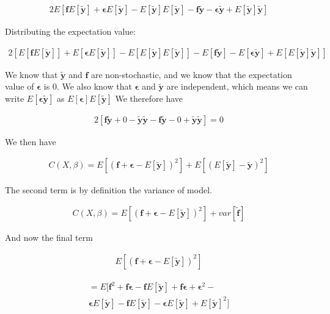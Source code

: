 \documentclass[twocolumn,10pt,cleanfoot]{asme2ej}
\begin{document}
\begin{gather}
2E\left[\bm{f}E[\bm{\tilde{y}}] + \bm{\epsilon}E[\bm{\tilde{y}}] - E[\bm{\tilde{y}}]E[\bm{\tilde{y}}] - \bm{f}\bm{\tilde{y}} - \bm{\epsilon}\bm{\tilde{y}} + E[\bm{\tilde{y}}]\bm{\tilde{y}}\right] 
\end{gather}

Distributing the expectation value:

\begin{gather}
2\left[E[\bm{f}E[\bm{\tilde{y}}]] + E[\bm{\epsilon}E[\bm{\tilde{y}}]] - E[E[\bm{\tilde{y}}]E[\bm{\tilde{y}}]] - E[\bm{f}\bm{\tilde{y}}] - E[\bm{\epsilon}\bm{\tilde{y}}] + E[E[\bm{\tilde{y}}]\bm{\tilde{y}}]\right] 
\end{gather}

We know that $\bm{\tilde{y}}$ and $\bm{f}$ are non-stochastic, and we know that the expectation value of $\bm{\epsilon}$ is $0$. We also know that 
$\bm{\epsilon}$ and $\bm{\tilde{y}}$ are independent, which means we can write $E[\bm{\epsilon}\bm{\tilde{y}}]$ as $E[\bm{\epsilon}]E[\bm{\tilde{y}}]$ We therefore have

\begin{gather}
2\left[\bm{f}\bm{\tilde{y}} + 0 - \bm{\tilde{y}}\bm{\tilde{y}} - \bm{f}\bm{\tilde{y}} - 0 + \bm{\tilde{y}}\bm{\tilde{y}}\right] = 0 
\end{gather}

We then have

\begin{gather}
C(X,\beta) = E\left[(\bm{f} + \bm{\epsilon} - E[\bm{\tilde{y}}])^2\right] + E\left[(E[\bm{\tilde{y}}] - \bm{\tilde{y}})^2\right] 
\end{gather}

The second term is by definition the variance of model.

\begin{gather}
C(X,\beta) = E\left[(\bm{f} + \bm{\epsilon} - E[\bm{\tilde{y}}])^2\right] + var[\bm{\tilde{f}}] 
\end{gather}

And now the final term

\begin{gather}
E\left[(\bm{f} + \bm{\epsilon} - E[\bm{\tilde{y}}])^2\right]
\end{gather}

\begin{multline}
= E[\bm{f}^2 + \bm{f}\bm{\epsilon} - \bm{f}E[\bm{\tilde{y}}] + \bm{f\epsilon} + \bm{\epsilon}^2 - \\ 
	\bm{\epsilon}E[\bm{\tilde{y}}] - \bm{f}E[\bm{\tilde{y}}] - \bm{\epsilon}E[\bm{\tilde{y}}] + E[\bm{\tilde{y}}]^2]
\end{multline}
\end{document}
